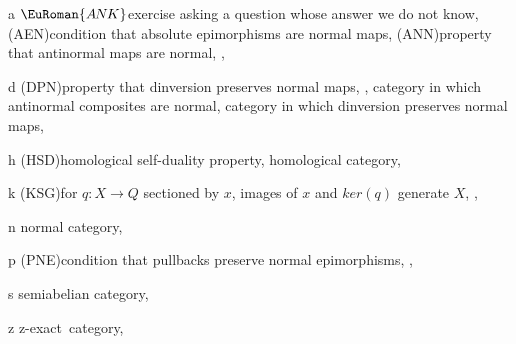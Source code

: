 \documentclass [12pt,oneside]{book}%
\theoremstyle{captionstyle}  %
\newcommand{\IndSep}{\qquad}
\newcommand{\hy}{\text{-}}													%
\newcommand{\from}{\colon}				%
\newcommand{\ZExact}{z-exact}									%
\newcommand{\KerMap}[1]{\textit{ker}(#1)}		     	%
\newcommand{\HSDInline}{(HSD)}																%
\newcommand{\DPNInline}{(DPN)}																%
\newcommand{\ANNInline}{(ANN)}																%
\newcommand{\PNEInline}{(PNE)}																%
\newcommand{\AENInline}{(AEN)}																%
\newcommand{\KSGInline}{(KSG)}																%
\begin{document}
%
\begin{theindex}

    \item a
    \subitem $\EuRoman {A{\kern -0.2ex}N{\kern -0.15ex}K}$\IndSep exercise asking a question whose answer we do not know,
    \subitem \AENInline \IndSep condition that absolute epimorphisms are normal maps,
    \subitem \ANNInline \IndSep property that antinormal maps are normal,
    , 

    \indexspace

    \item d
    \subitem \DPNInline \IndSep property that dinversion preserves normal maps,
    , 
    \IndSep category in which antinormal composites are normal,
    \IndSep category in which dinversion preserves normal maps,

    \indexspace

    \item h
    \subitem \HSDInline \IndSep homological self-duality property,
    \IndSep homological category,

    \indexspace

    \item k
    \subitem \KSGInline \IndSep for $q\from X\to Q$ sectioned by $x$, images of $x$ and $\KerMap {q}$ generate $X$,
    , 

    \indexspace

    \item n
    \IndSep normal category,

    \indexspace

    \item p
    \subitem \PNEInline \IndSep condition that pullbacks preserve normal epimorphisms,
    , 

    \indexspace

    \item s
    \IndSep semiabelian category,

    \indexspace

    \item z
    \subitem {\color {Cerulean} $\EuRoman {z\hy Ex}$}\IndSep \ZExact \ category,

\end{theindex}
\end{document}
